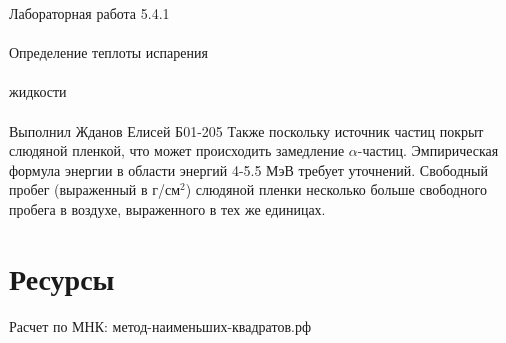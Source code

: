 \documentclass{astroedu-lab}
\begin{document}
\begin{problem}{\huge Лабораторная работа 5.4.1\\\\Определение теплоты испарения\\\\жидкости\\\\Выполнил Жданов Елисей Б01-205}
Также поскольку источник частиц покрыт слюдяной пленкой, что может происходить замедление $\alpha$-частиц. Эмпирическая формула энергии в области энергий 4-5.5 МэВ требует уточнений. Свободный пробег (выраженный в г/см$^2$) слюдяной пленки несколько больше свободного пробега в воздухе, выраженного в тех же единицах.
	
%	



	
%
%


\section{Ресурсы}

Расчет по МНК: метод-наименьших-квадратов.рф


\end{problem}
\end{document}
